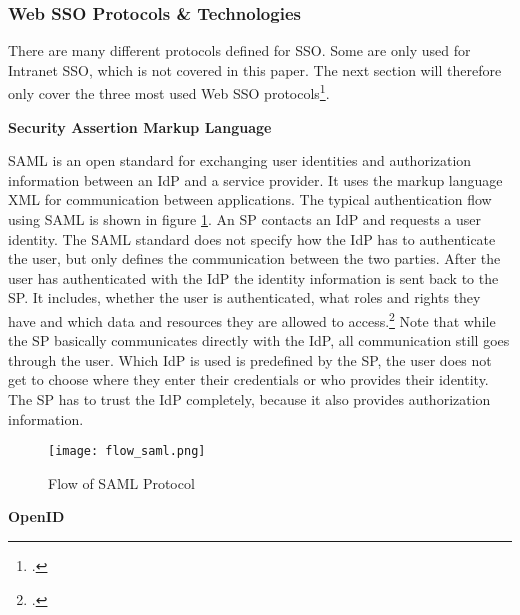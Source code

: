 \subsubsection{Web SSO Protocols \& Technologies}

There are many different protocols defined for \ac{SSO}.
Some are only used for Intranet \ac{SSO}, which is not covered in this paper.
The next section will therefore only cover the three most used Web \ac{SSO} protocols\footcite[Cp.][]{OneLoginFIMTechnologies}.

\textbf{Security Assertion Markup Language}

\ac{SAML} is an open standard for exchanging user identities and authorization information between
an \ac{IdP} and a service provider.
It uses the markup language XML for communication between applications.
The typical authentication flow using \ac{SAML} is shown in figure \ref{fig:flow_saml}.
An \ac{SP} contacts an \ac{IdP} and requests a user identity.
The \ac{SAML} standard does not specify how the \ac{IdP} has to authenticate the user,
but only defines the communication between the two parties.
After the user has authenticated with the \ac{IdP} the identity information is sent back to 
the \ac{SP}. It includes, whether the user is authenticated, what roles and rights they have and
which data and resources they are allowed to access.\footcite[Cp.][p. 137]{Radha2012}
Note that while the \ac{SP} basically communicates directly with the \ac{IdP}, all communication
still goes through the user. Which \ac{IdP} is used is predefined by the \ac{SP}, the user does not
get to choose where they enter their credentials or who provides their identity.
The \ac{SP} has to trust the \ac{IdP} completely, because it also provides authorization information.

\begin{figure}[H]
    \centering
    \caption{Flow of SAML Protocol}
	\label{fig:flow_saml}
    \texttt{[image: flow\_saml.png]}
    \\
    \cite[Source:][p. 21]{Bazaz2016}
\end{figure}

\textbf{OpenID}

